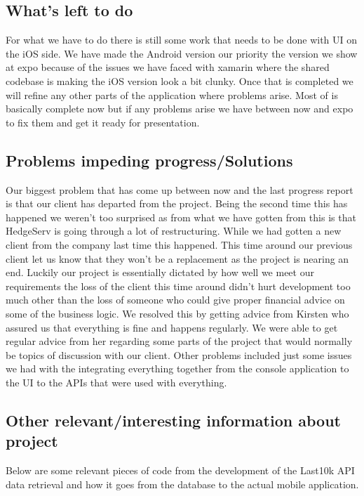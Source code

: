 \documentclass[letterpaper,10pt,titlepage,journal,compsoc,draftclsnofoot,onecolumn]{IEEEtran}
\begin{document}
 
\subsection{What's left to do}

For what we have to do there is still some work that needs to be done with UI on the iOS side. We have made the Android version our priority the version we show at expo because of the issues we have faced with xamarin where the shared codebase is making the iOS version look a bit clunky. Once that is completed we will refine any other parts of the application where problems arise. Most of is basically complete now but if any problems arise we have between now and expo to fix them and get it ready for presentation. 
 
\subsection{Problems impeding progress/Solutions}

Our biggest problem that has come up between now and the last progress report is that our client has departed from the project. Being the second time this has happened we weren’t too surprised as from what we have gotten from this is that HedgeServ is going through a lot of restructuring. While we had gotten a new client from the company last time this happened. This time around our previous client let us know that they won’t be a replacement as the project is nearing an end. Luckily our project is essentially dictated by how well we meet our requirements the loss of the client this time around didn’t hurt development too much other than the loss of someone who could give proper financial advice on some of the business logic. We resolved this by getting advice from Kirsten who assured us that everything is fine and happens regularly. We were able to get regular advice from her regarding some parts of the project that would normally be topics of discussion with our client. Other problems included just some issues we had with the integrating everything together from the console application to the UI to the APIs that were used with everything. 

\subsection{Other relevant/interesting information about project}
Below are some relevant pieces of code from the development of the Last10k API data retrieval and how it goes from the database to the actual mobile application. 
\end{document}

